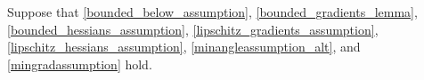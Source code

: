 Suppose that \cref{bounded_below_assumption}, \cref{bounded_gradients_lemma}, \cref{bounded_hessians_assumption}, \cref{lipschitz_gradients_assumption}, \cref{lipschitz_hessians_assumption}, \cref{minangleassumption_alt}, and \cref{mingradassumption} hold.
